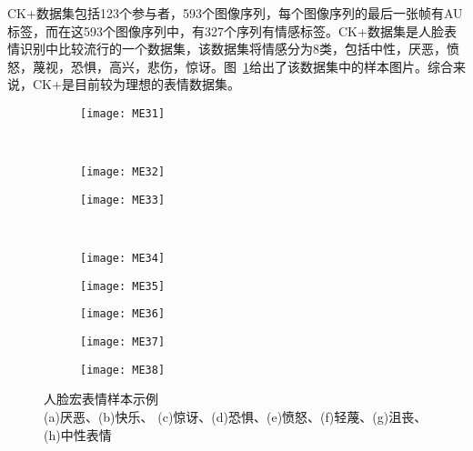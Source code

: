 CK+数据集包括123个参与者，593个图像序列，每个图像序列的最后一张帧有AU标签，而在这593个图像序列中，有327个序列有情感标签。CK+数据集是人脸表情识别中比较流行的一个数据集，该数据集将情感分为8类，包括中性，厌恶，愤怒，蔑视，恐惧，高兴，悲伤，惊讶。图~\ref{fig1}给出了该数据集中的样本图片。综合来说，CK+是目前较为理想的表情数据集。

\begin{figure}[!htbp]
    \centering
    \begin{subfigure}[b]{0.22\textwidth}
      \texttt{[image: ME31]}
      \caption{}
    \end{subfigure}%
    ~%
    \begin{subfigure}[b]{0.22\textwidth}
      \texttt{[image: ME32]}
      \caption{}
    \end{subfigure}
    \begin{subfigure}[b]{0.22\textwidth}
      \texttt{[image: ME33]}
      \caption{}
    \end{subfigure}%
    ~%
    \begin{subfigure}[b]{0.22\textwidth}
      \texttt{[image: ME34]}
      \caption{}
    \end{subfigure}
    \begin{subfigure}[b]{0.22\textwidth}
      \texttt{[image: ME35]}
      \caption{}
    \end{subfigure}
    \begin{subfigure}[b]{0.22\textwidth}
      \texttt{[image: ME36]}
      \caption{}
    \end{subfigure}
    \begin{subfigure}[b]{0.22\textwidth}
      \texttt{[image: ME37]}
      \caption{}
    \end{subfigure}
    \begin{subfigure}[b]{0.22\textwidth}
      \texttt{[image: ME38]}
      \caption{}
    \end{subfigure}
    \caption{人脸宏表情样本示例\\ \footnotesize \textmd{(a)厌恶、(b)快乐、 (c)惊讶、(d)恐惧、(e)愤怒、(f)轻蔑、(g)沮丧、(h)中性表情}}
    \label{fig1}
\end{figure}


